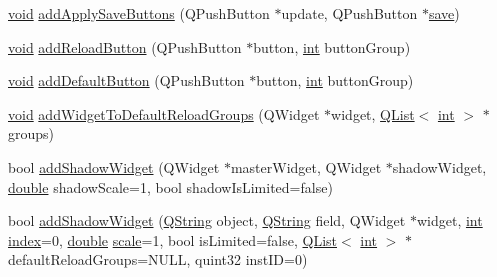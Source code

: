\begin{DoxyCompactItemize}
\item 
\hyperlink{group___u_a_v_objects_plugin_ga444cf2ff3f0ecbe028adce838d373f5c}{void} \hyperlink{group___u_a_v_object_widget_utils_ga38c270f9a29f4e190e71414bdce82590}{add\-Apply\-Save\-Buttons} (Q\-Push\-Button $\ast$update, Q\-Push\-Button $\ast$\hyperlink{group___u_a_v_object_widget_utils_gabae71bcf9c71f99595c365fd49b342fc}{save})
\item 
\hyperlink{group___u_a_v_objects_plugin_ga444cf2ff3f0ecbe028adce838d373f5c}{void} \hyperlink{group___u_a_v_object_widget_utils_ga08a7e3f2686fdb1ef91db0843cb9414e}{add\-Reload\-Button} (Q\-Push\-Button $\ast$button, \hyperlink{ioapi_8h_a787fa3cf048117ba7123753c1e74fcd6}{int} button\-Group)
\item 
\hyperlink{group___u_a_v_objects_plugin_ga444cf2ff3f0ecbe028adce838d373f5c}{void} \hyperlink{group___u_a_v_object_widget_utils_gac0e04866c45a89a3f2c6f3241afa86d3}{add\-Default\-Button} (Q\-Push\-Button $\ast$button, \hyperlink{ioapi_8h_a787fa3cf048117ba7123753c1e74fcd6}{int} button\-Group)
\item 
\hyperlink{group___u_a_v_objects_plugin_ga444cf2ff3f0ecbe028adce838d373f5c}{void} \hyperlink{group___u_a_v_object_widget_utils_gabdd18a22aae23df220d48868ecbdf3a0}{add\-Widget\-To\-Default\-Reload\-Groups} (Q\-Widget $\ast$widget, \hyperlink{class_q_list}{Q\-List}$<$ \hyperlink{ioapi_8h_a787fa3cf048117ba7123753c1e74fcd6}{int} $>$ $\ast$groups)
\item 
bool \hyperlink{group___u_a_v_object_widget_utils_ga726f8720d2d1bb52d38a6425fbfab448}{add\-Shadow\-Widget} (Q\-Widget $\ast$master\-Widget, Q\-Widget $\ast$shadow\-Widget, \hyperlink{_super_l_u_support_8h_a8956b2b9f49bf918deed98379d159ca7}{double} shadow\-Scale=1, bool shadow\-Is\-Limited=false)
\item 
bool \hyperlink{group___u_a_v_object_widget_utils_ga285c7e48c6b730133169c0226cbc59c4}{add\-Shadow\-Widget} (\hyperlink{group___u_a_v_objects_plugin_gab9d252f49c333c94a72f97ce3105a32d}{Q\-String} object, \hyperlink{group___u_a_v_objects_plugin_gab9d252f49c333c94a72f97ce3105a32d}{Q\-String} field, Q\-Widget $\ast$widget, \hyperlink{ioapi_8h_a787fa3cf048117ba7123753c1e74fcd6}{int} \hyperlink{glext_8h_ab47dd9958bcadea08866b42bf358e95e}{index}=0, \hyperlink{_super_l_u_support_8h_a8956b2b9f49bf918deed98379d159ca7}{double} \hyperlink{glext_8h_a281421b881aa7a1266842b73a3bc7655}{scale}=1, bool is\-Limited=false, \hyperlink{class_q_list}{Q\-List}$<$ \hyperlink{ioapi_8h_a787fa3cf048117ba7123753c1e74fcd6}{int} $>$ $\ast$default\-Reload\-Groups=N\-U\-L\-L, quint32 inst\-I\-D=0)

\end{DoxyCompactItemize}
